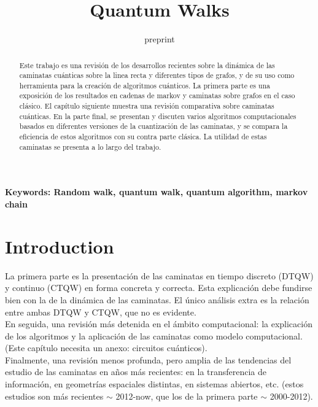 \documentclass[journal, a4paper]{IEEEtran}
\begin{document}
	\title{Quantum Walks}
	\author{preprint}
	\maketitle

\begin{abstract}
	Este trabajo es una revisión de los desarrollos recientes sobre la dinámica  de las caminatas cuánticas sobre la linea recta y diferentes tipos de grafos, y de su uso como herramienta para la creación de algoritmos cuánticos. La primera parte es una exposición de los resultados en cadenas de markov y caminatas sobre grafos en el caso clásico. El capítulo siguiente muestra una revisión comparativa sobre caminatas cuánticas.  En la parte final, se presentan y discuten varios algoritmos computacionales basados en diferentes versiones de la cuantización de las caminatas, y se compara la eficiencia de estos algoritmos con su contra parte clásica. La utilidad de estas caminatas se presenta a lo largo del trabajo.
\end{abstract}

\textbf{\small Keywords: Random walk, quantum walk, quantum algorithm, markov chain}\\

\section{Introduction}
	\noindent La primera parte es la presentación de las caminatas en tiempo discreto (DTQW) y continuo (CTQW) en forma concreta y correcta. 
	Esta explicación debe fundirse bien con la de la dinámica de las caminatas. El único análisis extra es la relación entre ambas DTQW y CTQW, que no es evidente. \\
	
	\noindent En seguida, una revisión más detenida en el ámbito computacional: la explicación de los algoritmos y la aplicación de las caminatas como modelo computacional. 
	(Este capítulo necesita un anexo: circuitos cuánticos).\\
	
	\noindent Finalmente, una revisión menos profunda, pero amplia de las tendencias del estudio de las caminatas en años más recientes: en la transferencia de información, en geometrías espaciales distintas, en sistemas abiertos, etc.
	(estos estudios son más recientes  $\sim$ 2012-now, que los de la primera parte $\sim$ 2000-2012).
	
	\newpage
	
\end{document}

